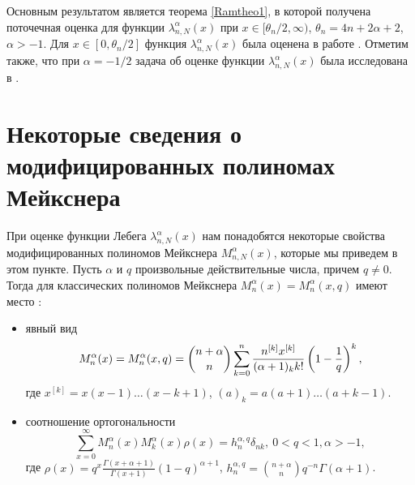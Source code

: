 Основным результатом является теорема \ref{Ramtheo1}, в которой получена поточечная оценка для функции $\lambda_{n,N}^{\alpha}(x)$ при $x\in[\theta_n/2,\infty)$, $\theta_n=4n+2\alpha+2$, $\alpha>-1$.
Для $x\in[0,\theta_n/2]$ функция $\lambda_{n,N}^{\alpha}(x)$ была оценена в работе \cite{Rampetrazav}. Отметим также, что при $\alpha=-1/2$ задача об оценке функции $\lambda_{n,N}^{\alpha}(x)$ была исследована в \cite{Ram3}.

\section{Некоторые сведения о модифицированных полиномах Мейкснера}

При оценке функции Лебега $\lambda_{n,N}^{\alpha}(x)$ нам понадобятся некоторые свойства модифицированных полиномов Мейкснера $M_{n,N}^{\alpha}(x)$, которые мы приведем в этом пункте.
Пусть $\alpha$ и $q$ произвольные действительные числа, причем $q\neq0$. Тогда для классических полиномов Мейкснера $M_n^\alpha(x)=M_n^\alpha(x,q)$ имеют место
\cite{RamNik, RamBateman, RamSharMnog}:
\begin{itemize}
  \item
явный вид
\begin{equation*}
M_n^\alpha(x)=M_n^\alpha(x,q)={n+\alpha\choose n}\sum_{k=0}^n{n^{[k]}x^{[k]}\over(\alpha+1)_kk!}\left(1-{1\over q}\right)^k,
\end{equation*}
где $x^{[k]}=x(x-1)\ldots (x-k+1)$, $(a)_k=a(a+1)\ldots(a+k-1)$.
\item
соотношение ортогональности
$$
\sum_{x=0}^{\infty} M_{n}^\alpha(x)M_{k}^\alpha(x)\rho(x)=h_{n}^{\alpha,q}\delta_{nk},\ 0<q<1, \alpha>-1,
$$
где $\rho(x)=q^x\frac{\Gamma(x+\alpha+1)}{\Gamma(x+1)}(1-q)^{\alpha+1}$,
$h_{n}^{\alpha,q}={n+\alpha\choose n}q^{-n}\Gamma(\alpha+1)$.
\end{itemize}

